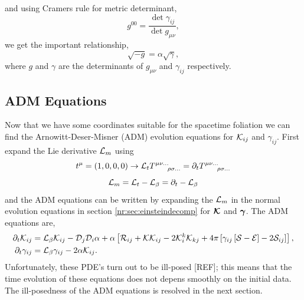 and using Cramers rule for metric determinant,
\begin{equation} g^{00} = \frac{\det{\gamma_{ij}}}{\det{g_{\mu\nu}}},\end{equation}
we get the important relationship,
\begin{equation} \sqrt{-g} = \alpha \sqrt{\gamma} ,\label{nr:eq:gay}\end{equation}
where $g$ and $\gamma$ are the determinants of $g_{\mu\nu}$ and $\gamma_{ij}$ respectively.

\subsection{ADM Equations} \label{nr:sec:ADM}
Now that we have some coordinates suitable for the spacetime foliation we can find the Arnowitt-Deser-Misner (ADM) evolution equations for $\mathcal{K}_{ij}$ and $\gamma_{ij}$. First expand the Lie derivative $\mathcal{L}_m$ using
\begin{equation} t^{\mu} = (1,0,0,0) \rightarrow \mathcal{L}_t {{T}}^{\mu\nu ...}_{\;\;\;\;\;\;\;\rho\sigma ...} = \partial_t {{T}}^{\mu\nu ...}_{\;\;\;\;\;\;\;\rho\sigma ...}\end{equation}
\begin{equation} \mathcal{L}_m = \mathcal{L}_{t} - \mathcal{L}_\beta  = \partial_t - \mathcal{L}_\beta\end{equation}
and the ADM equations can be written by expanding the $\mathcal{L}_m$ in the normal evolution equations in section \ref{nr:sec:einsteindecomp} for $\boldsymbol{\mathcal{K}}$ and $\boldsymbol{\gamma}$. The ADM equations are,
\begin{align} 
\partial_t \mathcal{K}_{ij} &= \mathcal{L}_\beta \mathcal{K}_{ij}  -\mathcal{D}_j\mathcal{D}_i \alpha + \alpha \left[ \mathcal{R}_{ij} + \mathcal{K}\mathcal{K}_{ij} - 2\mathcal{K}^k_i\mathcal{K}_{kj} + 4\pi \left[ \gamma_{ij}\left[ \mathcal{S}-\mathcal{E}\right]-2\mathcal{S}_{ij}\right]\right],\\
\partial_t \gamma_{ij} &= \mathcal{L}_\beta \gamma_{ij} - 2\alpha\mathcal{K}_{ij}.\end{align}
Unfortunately, these PDE's turn out to be ill-posed [REF]; this means that the time evolution of these equations does not depens smoothly on the initial data. The ill-posedness of the ADM equations is resolved in the next section.


